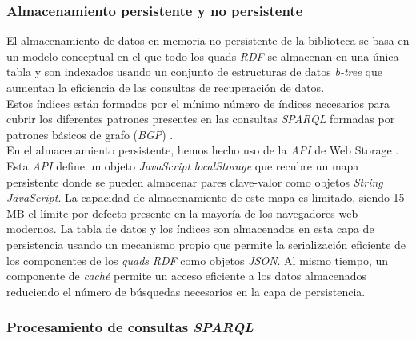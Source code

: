 \subsubsection{Almacenamiento persistente y no persistente}

El almacenamiento de datos en memoria no persistente de la biblioteca se basa en un modelo conceptual en el que todo los quads \textit{RDF} se almacenan en una \'unica tabla y son indexados usando un conjunto de estructuras de datos \textit{b-tree} que aumentan la eficiencia de las consultas de recuperaci\'on de datos.\\
Estos \'indices est\'an formados por el m\'inimo n\'umero de \'indices necesarios para cubrir los diferentes patrones presentes en las consultas \textit{SPARQL} formadas por patrones b\'asicos de grafo (\textit{BGP}) \cite{yars}.\\
En el almacenamiento persistente, hemos hecho uso de la \textit{API} de Web Storage \cite{webstorage}. Esta \textit{API} define un objeto \textit{JavaScript} \textit{localStorage} que recubre un mapa persistente donde se pueden almacenar pares clave-valor como objetos \textit{String} \textit{JavaScript}. La capacidad de almacenamiento de este mapa es limitado, siendo 15 MB el l\'imite por defecto presente en la mayor\'ia de los navegadores web modernos. La tabla de datos y los \'indices son almacenados en esta capa de persistencia usando un mecanismo propio que permite la serializaci\'on eficiente de los componentes de los \textit{quads} \textit{RDF} como objetos \textit{JSON}. Al mismo tiempo, un componente de \textit{cach\'e} permite un acceso eficiente a los datos almacenados reduciendo el n\'umero de b\'usquedas necesarios en la capa de persistencia.

\subsubsection{Procesamiento de consultas \textit{SPARQL}}

